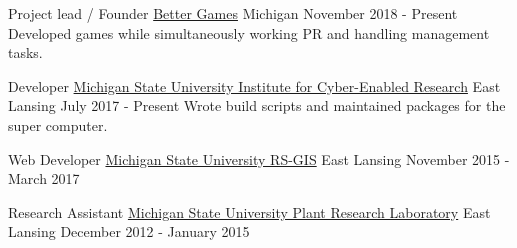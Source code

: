 
\begin{cventries}
  \cventry
    {Project lead / Founder} %
    {\href{https://www.better-games.org}{Better Games}} %
    {Michigan} %
    {November 2018 - Present} %
    {
        {Developed games while simultaneously working PR and handling management tasks.}
    }

  \cventry
    {Developer}
    {\href{https://icer.msu.edu}{Michigan State University Institute for Cyber-Enabled Research}}
    {East Lansing}
    {July 2017 - Present}
    {
        {Wrote build scripts and maintained packages for the super computer.}
    }

  \cventry
    {Web Developer}
    {\href{http://www.rsgis.msu.edu}{Michigan State University RS-GIS}}
    {East Lansing}
    {November 2015 - March 2017}
    {
    }

  \cventry
    {Research Assistant}
    {\href{https://prl.natsci.msu.edu/research-tech/center-for-advanced-algal-and-plant-phenotyping}{Michigan State University Plant Research Laboratory}}
    {East Lansing}
    {December 2012 - January 2015}
    {
    }
\end{cventries}
